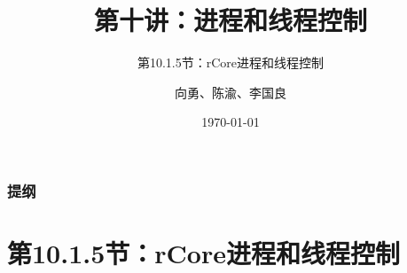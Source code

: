 



\title[第10讲]{第十讲：进程和线程控制} %
\subtitle{第10.1.5节：rCore进程和线程控制}
\author{向勇、陈渝、李国良} %
\date{\today} %



\begin{frame}
\titlepage %
\end{frame}
\begin{frame}
\frametitle{提纲} %
\tableofcontents %
\end{frame}
\section{第10.1.5节：rCore进程和线程控制}%
